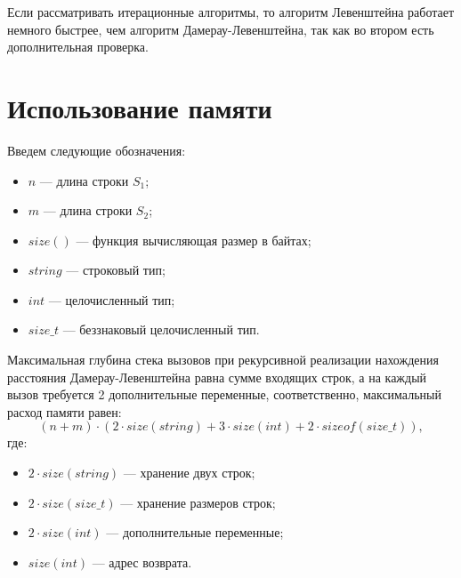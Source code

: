 Если рассматривать итерационные алгоритмы, то алгоритм Левенштейна работает немного быстрее,
чем алгоритм Дамерау-Левенштейна, так как во втором есть дополнительная проверка.

\clearpage

\section{Использование памяти}

Введем следующие обозначения:
\begin{itemize}
	\item$n$ --- длина строки $S_{1}$;
	\item$m$ --- длина строки $S_{2}$;
	\item$size()$ --- функция вычисляющая размер в байтах;
	\item $string$ --- строковый тип;
	\item $int$ --- целочисленный тип;
	\item $size\_t$ --- беззнаковый целочисленный тип.
\end{itemize}

Максимальная глубина стека вызовов при рекурсивной реализации нахождения расстояния Дамерау-Левенштейна равна сумме входящих строк, а на каждый вызов требуется 2 дополнительные переменные, соответственно, максимальный расход памяти равен:
\begin{equation}
	\label{eq:dl_rec_memory}
	(n + m) \cdot (2 \cdot size(string) + 3 \cdot size(int) + 2 \cdot sizeof(size\_t)),
\end{equation}
где:
\begin{itemize}
	\item $2 \cdot size(string)$ --- хранение двух строк;
	\item $2 \cdot size(size\_t)$ --- хранение размеров строк;
	\item $2 \cdot size(int)$ --- дополнительные переменные;
	\item $size(int)$ --- адрес возврата.
\end{itemize}

